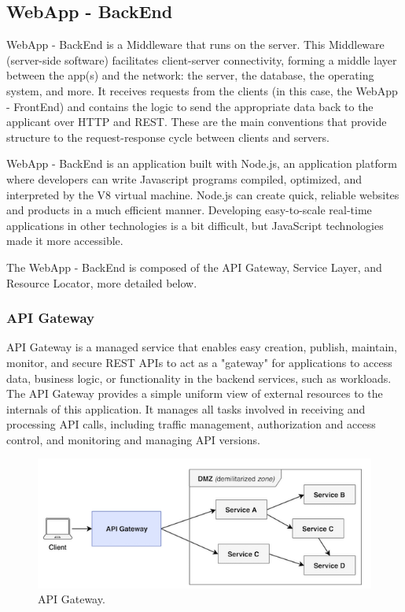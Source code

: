 \subsection{WebApp - BackEnd}\label{sec:WebAppBackEnd}
WebApp - BackEnd is a Middleware that runs on the server. This Middleware (server-side software) facilitates client-server connectivity, forming a middle layer between the app(s) and the network: the server, the database, the operating system, and more. It receives requests from the clients (in this case, the WebApp - FrontEnd) and contains the logic to send the appropriate data back to the applicant over HTTP and REST.  These are the main conventions that provide structure to the request-response cycle between clients and servers.

WebApp - BackEnd is an application built with Node.js, an application platform where developers can write Javascript programs compiled, optimized, and interpreted by the V8 virtual machine. Node.js can create quick, reliable websites and products in a much efficient manner. Developing easy-to-scale real-time applications in other technologies is a bit difficult, but JavaScript technologies made it  more accessible.

The WebApp - BackEnd is composed of the API Gateway, Service Layer, and Resource Locator, more detailed below.

\subsubsection{API Gateway}\label{sec:APIGateway}
API Gateway is a managed service that enables easy  creation, publish, maintain, monitor, and secure REST APIs to act as a "gateway" for applications to access data, business logic, or functionality in the backend services, such as workloads. The API Gateway provides a simple uniform view of external resources to the internals of this application. It manages all tasks involved in receiving and processing API calls, including traffic management, authorization and access control, and monitoring and managing API versions.

\begin{figure}[htbp]
\begin{center}
  \includegraphics[scale=0.75]{images/apigateway.png}
\caption{API Gateway.}
\label{default-regular2}
\end{center}
\end{figure}

